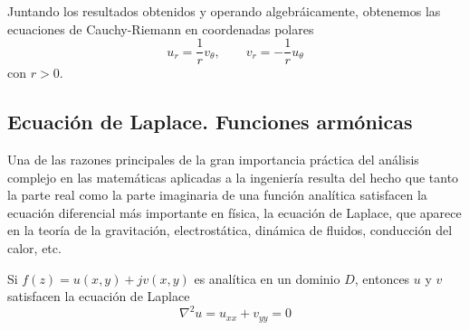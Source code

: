 Juntando los resultados obtenidos y operando algebráicamente, obtenemos las ecuaciones de Cauchy-Riemann en coordenadas polares
\begin{equation}
  u_r = \frac{1}{r}v_\theta, \qquad v_r =  -\frac{1}{r}u_\theta
\end{equation} 
con $r>0$.

\subsection{Ecuación de Laplace. Funciones armónicas}

Una de las razones principales de la gran importancia práctica del análisis complejo en las matemáticas aplicadas a la ingeniería resulta del hecho que tanto la parte real como la parte imaginaria de una función analítica satisfacen la ecuación diferencial más importante en física, la ecuación de Laplace, que aparece en la teoría de la gravitación, electrostática, dinámica de fluidos, conducción del calor, etc.

\begin{theorem}
  Si $f(z)=u(x,y)+jv(x,y)$ es analítica en un dominio $D$, entonces $u$ y $v$ satisfacen la ecuación de Laplace
  \begin{equation}
    \nabla^2 u = u_{xx} + v_{yy} = 0
  \end{equation}
\end{theorem}
